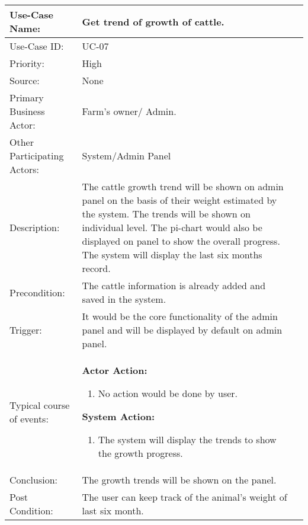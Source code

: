 \begin{tabular}{|l|p{}|p{}|}
	\hline
	Use-Case Name: & Get trend of growth of cattle. \\ \hline
	Use-Case ID:& UC-07 \\\hline
	Priority:& High\\ \hline
	Source:& None \\ \hline
	Primary Business Actor: & Farm's owner/ Admin.\\ \hline
	Other Participating Actors:&  System/Admin Panel\\ \hline
	Description:& The cattle growth trend will be shown on admin panel on the basis of their weight estimated by the system. The trends will be shown on individual level. The pi-chart would also be displayed on panel to show the overall progress.  The system will display the last six months record.   \\ \hline
	Precondition:& The cattle information is already added and saved in the system.     \\ \hline
	Trigger:&It would be the core functionality of the admin panel and will be displayed by default on admin panel.     \\ \hline 
	Typical course of events:&  \textbf{Actor Action:}
	\begin{enumerate}
		\item No action would be done by user.  
	\end{enumerate}
	\textbf{System Action: }
	\begin{enumerate}
		\item The system will display the trends to show the growth progress. 
	\end{enumerate}
	
	\\ \hline
	Conclusion:  & The growth trends will be shown on the panel.\\ \hline
	Post Condition: &  The user can keep track of the animal’s weight of last six month. \\ \hline
\end{tabular}\\
